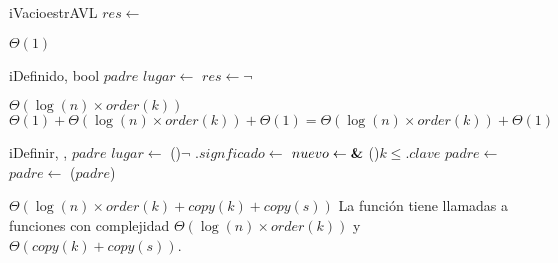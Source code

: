 \begin{Algoritmos}


  \begin{algoritmo}{iVacio}{}{estrAVL}
    $res \gets$ \nil{} 
  \end{algoritmo}
  \datosAlgoritmo{} %
  {} %
  {} %
  {$\Theta(1)$} %
  {} %

  \begin{algoritmo}{iDefinido}{, }{bool}
     $padre$ \;
     $lugar \gets$  
    $res \gets \neg$  
  \end{algoritmo}
  \datosAlgoritmo{} %
  {} %
  {} %
  {$\Theta(\log(n) \times order(k))$} %
  {$\Theta(1) + \Theta(\log(n) \times order(k)) + \Theta(1) = \Theta(\log(n) \times order(k)) + \Theta(1)$} %

  \begin{algoritmo}{iDefinir}{, , }{}
     $padre$ \;
     $lugar \gets$  
    \eIf(){$\neg$ }{
      .$signficado \gets$  
    }{
       $nuevo \gets \textbf{\&}$   
      \eIf(){$k \leq $$.clave$}{
        $padre \gets$  
      }{
        $padre \gets$  
      }
      \rebalancear($padre$) 
    }
  \end{algoritmo}
  \datosAlgoritmo{} %
  {} %
  {} %
  {$\Theta(\log(n) \times order(k) + copy(k) + copy(s))$} %
  {La funci\'on tiene llamadas a funciones con complejidad $\Theta(\log(n) \times order(k))$ y $\Theta(copy(k) + copy(s))$.} %


\end{Algoritmos}
